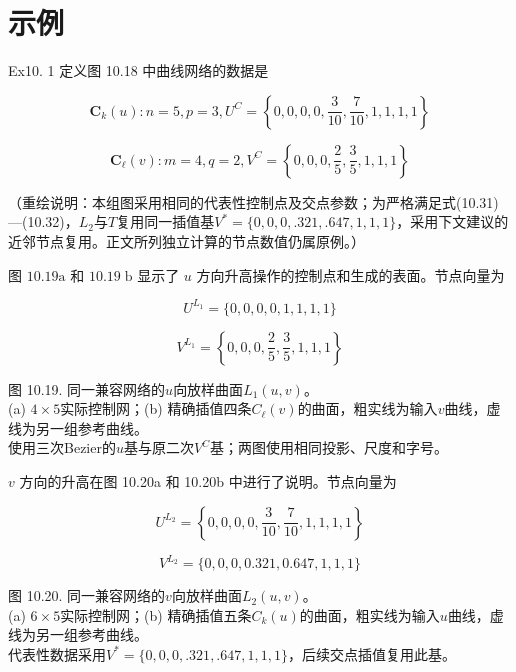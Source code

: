 \documentclass[../main.tex]{subfiles}
\begin{document}
\section*{示例}

Ex10. 1 定义图 10.18 中曲线网络的数据是

\[
{\mathbf{C}}_{k}\left( u\right)  : n = 5,p = 3,{U}^{C} = \left\{  {0,0,0,0,\frac{3}{10},\frac{7}{10},1,1,1,1}\right\}
\]

\[
{\mathbf{C}}_{\ell }\left( v\right)  : m = 4,q = 2,{V}^{C} = \left\{  {0,0,0,\frac{2}{5},\frac{3}{5},1,1,1}\right\}
\]

（重绘说明：本组图采用相同的代表性控制点及交点参数；为严格满足式(10.31)—(10.32)，$L_2$与$T$复用同一插值基$V^*=\{0,0,0,.321,.647,1,1,1\}$，采用下文建议的近邻节点复用。正文所列独立计算的节点数值仍属原例。）

图 \({10.19}\mathrm{a}\) 和 \({10.19}\mathrm{\;b}\) 显示了 \(u\) 方向升高操作的控制点和生成的表面。节点向量为

\[
{U}^{{L}_{1}} = \{ 0,0,0,0,1,1,1,1\}
\]

\[
{V}^{{L}_{1}} = \left\{  {0,0,0,\frac{2}{5},\frac{3}{5},1,1,1}\right\}
\]

\begin{center}
\begin{minipage}{37cm}
\vspace*{.6\baselineskip}
\centering
{}
\par\smallskip
图 10.19. 同一兼容网络的$u$向放样曲面$L_1(u,v)$。\\
(a) $4\times5$实际控制网；(b) 精确插值四条$C_\ell(v)$的曲面，粗实线为输入$v$曲线，虚线为另一组参考曲线。\\
使用三次Bezier的$u$基与原二次$V^C$基；两图使用相同投影、尺度和字号。
\end{minipage}
\end{center}

\(v\) 方向的升高在图 10.20a 和 10.20b 中进行了说明。节点向量为

\[
{U}^{{L}_{2}} = \left\{  {0,0,0,0,\frac{3}{10},\frac{7}{10},1,1,1,1}\right\}
\]

\[
{V}^{{L}_{2}} = \{ 0,0,0,{0.321},{0.647},1,1,1\}
\]

\begin{center}
\begin{minipage}{37cm}
\vspace*{.6\baselineskip}
\centering
{}
\par\smallskip
图 10.20. 同一兼容网络的$v$向放样曲面$L_2(u,v)$。\\
(a) $6\times5$实际控制网；(b) 精确插值五条$C_k(u)$的曲面，粗实线为输入$u$曲线，虚线为另一组参考曲线。\\
代表性数据采用$V^* =\{0,0,0,.321,.647,1,1,1\}$，后续交点插值复用此基。
\end{minipage}
\end{center}
\end{document}
